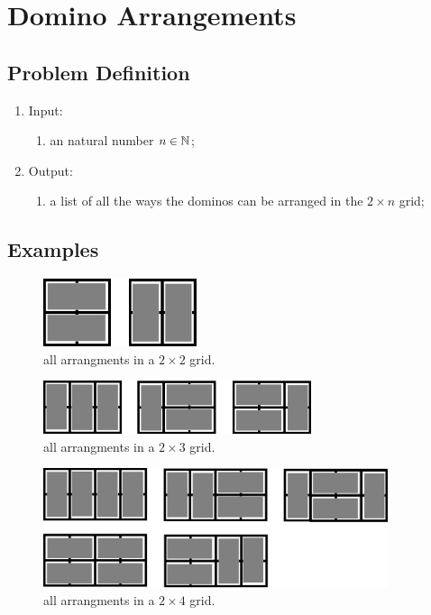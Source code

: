 \chapter{Domino Arrangements}

\section{Problem Definition}

\begin{enumerate}
    \item Input:
    \begin{enumerate}
        \item an natural number $n \in \mathbb{N}$;
    \end{enumerate}
    \item Output:
    \begin{enumerate}
        \item a list of all the ways the dominos can be arranged in the $2 \times n$ grid;
    \end{enumerate}
\end{enumerate}

\section{Examples}

\begin{figure}[H]
    \centering
    \includegraphics[width=0.4\textwidth]{images/domino_arrangements/2x2_all.png}
    \caption{all arrangments in a $2 \times 2$ grid.}
\end{figure}

\begin{figure}[H]
    \centering
    \includegraphics[width=0.7\textwidth]{images/domino_arrangements/2x3_all.png}
    \caption{all arrangments in a $2 \times 3$ grid.}
\end{figure}

\begin{figure}[H]
    \centering
    \includegraphics[width=0.9\textwidth]{images/domino_arrangements/2x4_all.png}
    \caption{all arrangments in a $2 \times 4$ grid.}
\end{figure}

